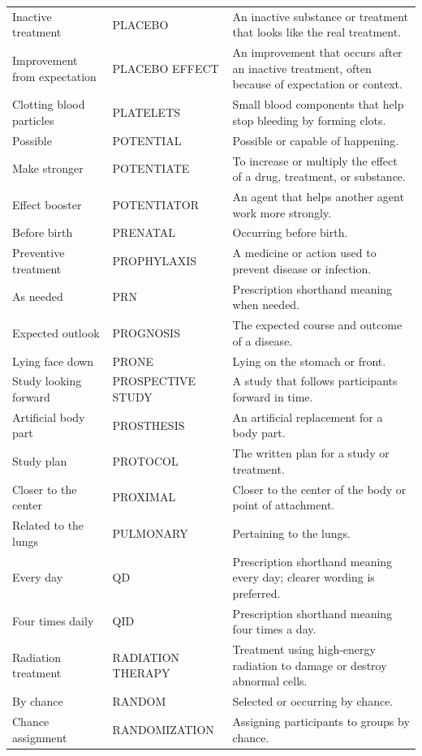 \begin{longtable}{>{\raggedright\arraybackslash}p{} >{\raggedright\arraybackslash}p{} >{\raggedright\arraybackslash}p{}}
Inactive treatment & PLACEBO & An inactive substance or treatment that looks like the real treatment. \\
Improvement from expectation & PLACEBO EFFECT & An improvement that occurs after an inactive treatment, often because of expectation or context. \\
Clotting blood particles & PLATELETS & Small blood components that help stop bleeding by forming clots. \\
Possible & POTENTIAL & Possible or capable of happening. \\
Make stronger & POTENTIATE & To increase or multiply the effect of a drug, treatment, or substance. \\
Effect booster & POTENTIATOR & An agent that helps another agent work more strongly. \\
Before birth & PRENATAL & Occurring before birth. \\
Preventive treatment & PROPHYLAXIS & A medicine or action used to prevent disease or infection. \\
As needed & PRN & Prescription shorthand meaning when needed. \\
Expected outlook & PROGNOSIS & The expected course and outcome of a disease. \\
Lying face down & PRONE & Lying on the stomach or front. \\
Study looking forward & PROSPECTIVE STUDY & A study that follows participants forward in time. \\
Artificial body part & PROSTHESIS & An artificial replacement for a body part. \\
Study plan & PROTOCOL & The written plan for a study or treatment. \\
Closer to the center & PROXIMAL & Closer to the center of the body or point of attachment. \\
Related to the lungs & PULMONARY & Pertaining to the lungs. \\
Every day & QD & Prescription shorthand meaning every day; clearer wording is preferred. \\
Four times daily & QID & Prescription shorthand meaning four times a day. \\
Radiation treatment & RADIATION THERAPY & Treatment using high-energy radiation to damage or destroy abnormal cells. \\
By chance & RANDOM & Selected or occurring by chance. \\
Chance assignment & RANDOMIZATION & Assigning participants to groups by chance. \\

\end{longtable}
